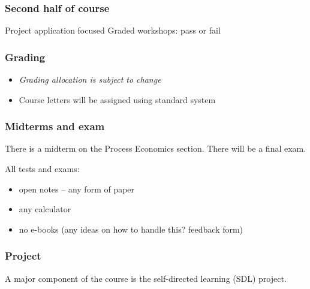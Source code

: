 \begin{frame}\frametitle{Second half of course}
	Project application focused
	Graded workshops: pass or fail
\end{frame}

\begin{frame}\frametitle{Grading}
	
	\begin{itemize}
		\item	\emph{Grading allocation is subject to change}
		\item	Course letters will be assigned using standard system
	\end{itemize}
\end{frame}

\begin{frame}\frametitle{Midterms and exam}
	
	There is a midterm on the Process Economics section.
	\vspace{12pt}
	There will be a final exam.
	\vspace{24pt}
	
	All tests and exams:
	\begin{itemize}
		\item	open notes -- any form of paper
		\item	any calculator
		\item	no e-books (any ideas on how to handle this? feedback form)
	\end{itemize}	
\end{frame}

\begin{frame}\frametitle{Project}
	A major component of the course is the self-directed learning (SDL) project.
\end{frame}

